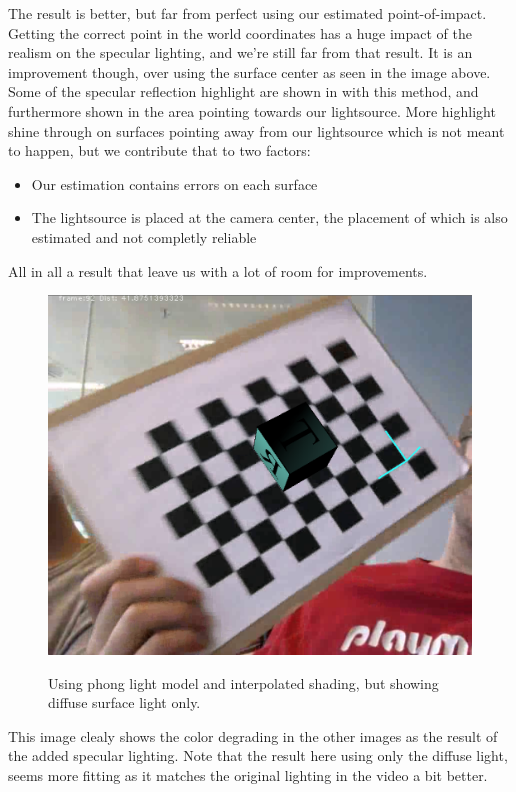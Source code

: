The result is better, but far from perfect using our estimated point-of-impact. Getting the correct point in the world coordinates has a huge impact of the realism on the specular lighting, and we're still far from that result. It is an improvement though, over using the surface center as seen in the image above. Some of the specular reflection highlight are shown in with this method, and furthermore shown in the area pointing towards our lightsource. More highlight shine through on surfaces pointing away from our lightsource which is not meant to happen, but we contribute that to two factors:
\begin{itemize}
	\item{Our estimation contains errors on each surface}
	\item{The lightsource is placed at the camera center, the placement of which is also estimated and not completly reliable}
\end{itemize}
All in all a result that leave us with a lot of room for improvements.
\begin{figure}[!htbp]
    \includegraphics{pics/phongDiffuseOnly.png}
    \label{fig:EphongDiffuseOnly}
    \caption{Using phong light model and interpolated shading, but showing diffuse surface light only.}
\end{figure}
This image clealy shows the color degrading in the other images as the result of the added specular lighting. Note that the result here using only the diffuse light, seems more fitting as it matches the original lighting in the video a bit better. 